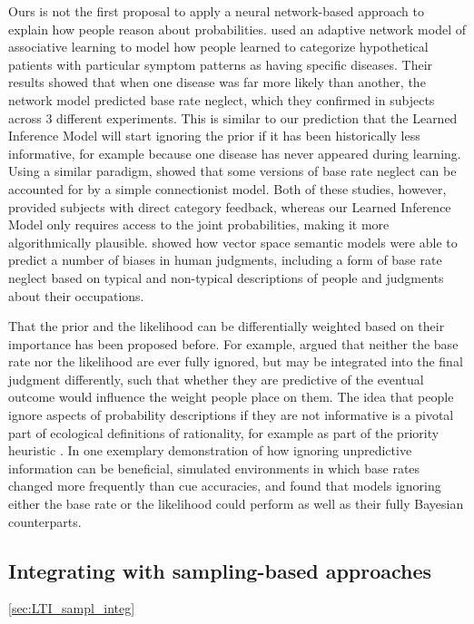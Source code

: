 Ours is not the first proposal to apply a neural network-based approach to explain how people reason about probabilities. \cite{gluck1988conditioning} used an adaptive network model of associative learning to model how people learned to categorize hypothetical patients with particular symptom patterns as having specific diseases. Their results showed that when one disease was far more likely than another, the network model predicted base rate neglect, which they confirmed in subjects across 3 different experiments. This is similar to our prediction that the Learned Inference Model will start ignoring the prior if it has been historically less informative, for example because one disease has never appeared during learning. Using a similar paradigm, \cite{shanks1991connectionist} showed that some versions of base rate neglect can be accounted for by a simple connectionist model. Both of these studies, however, provided subjects with direct category feedback, whereas our Learned Inference Model only requires access to the joint probabilities, making it more algorithmically plausible. \cite{bhatia2017associative} showed how vector space semantic models were able to predict a number of biases in human judgments, including a form of base rate neglect based on typical and non-typical descriptions of people and judgments about their occupations.

That the prior and the likelihood can be differentially weighted based on their importance has been proposed before. For example, \cite{koehler1996base} argued that neither the base rate nor the likelihood are ever fully ignored, but may be integrated into the final judgment differently, such that whether they are predictive of the eventual outcome would influence the weight people place on them. The idea that people ignore aspects of probability descriptions if they are not informative is a pivotal part of ecological definitions of rationality, for example as part of the priority heuristic \citep{brandstatter2006priority}. In one exemplary demonstration of how ignoring unpredictive information can be beneficial, \cite{todd2002testing} simulated environments in which base rates changed more frequently than cue accuracies, and found that models ignoring either the base rate or the likelihood could perform as well as their fully Bayesian counterparts.

\subsection{Integrating with sampling-based approaches}
\ref{sec:LTI_sampl_integ}

